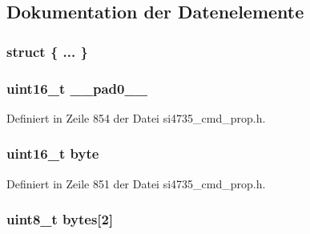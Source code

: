 \subsection{Dokumentation der Datenelemente}
\hypertarget{unionfm__blend__rssi__mono__thres_a37787e7d11997017d3dcf60dad8ab27a}{}\subsubsection[{"@105}]{\setlength{\rightskip}{0pt plus 5cm}struct \{ ... \} }\label{unionfm__blend__rssi__mono__thres_a37787e7d11997017d3dcf60dad8ab27a}
\hypertarget{unionfm__blend__rssi__mono__thres_a77132c2c26a75f5b8751b235cda23828}{}
\subsubsection[{\+\_\+\+\_\+pad0\+\_\+\+\_\+}]{\setlength{\rightskip}{0pt plus 5cm}uint16\+\_\+t \+\_\+\+\_\+pad0\+\_\+\+\_\+}\label{unionfm__blend__rssi__mono__thres_a77132c2c26a75f5b8751b235cda23828}


Definiert in Zeile 854 der Datei si4735\+\_\+cmd\+\_\+prop.\+h.

\hypertarget{unionfm__blend__rssi__mono__thres_ab0549c1b5ea980a02e7eab77e21fea49}{}
\subsubsection[{byte}]{\setlength{\rightskip}{0pt plus 5cm}uint16\+\_\+t byte}\label{unionfm__blend__rssi__mono__thres_ab0549c1b5ea980a02e7eab77e21fea49}


Definiert in Zeile 851 der Datei si4735\+\_\+cmd\+\_\+prop.\+h.

\hypertarget{unionfm__blend__rssi__mono__thres_a46e4c05d20a047ec169f60d3167e912e}{}
\subsubsection[{bytes}]{\setlength{\rightskip}{0pt plus 5cm}uint8\+\_\+t bytes\mbox{[}2\mbox{]}}\label{unionfm__blend__rssi__mono__thres_a46e4c05d20a047ec169f60d3167e912e}



